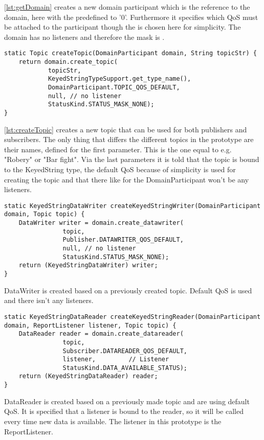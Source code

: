 \documentclass[Main]{subfiles}
\begin{document}
\codeTitle \ref{lst:getDomain} creates a new domain participant which is the reference to the domain, here with the  predefined to '0'.
Furthermore it specifies which QoS must be attached to the participant though the  is chosen here for simplicity.
The domain has no listeners and therefore the mask is .

\begin{lstlisting}[caption=RTIHelper: createTopic, style=Code-Java, label=lst:createTopic]
static Topic createTopic(DomainParticipant domain, String topicStr) {
	return domain.create_topic(
			topicStr, 
			KeyedStringTypeSupport.get_type_name(), 
			DomainParticipant.TOPIC_QOS_DEFAULT, 
			null, // no listener
			StatusKind.STATUS_MASK_NONE);
}
\end{lstlisting}


\codeTitle \ref{lst:createTopic} creates a new topic that can be used for both publishers and subscribers. The only thing that differs the different topics in the prototype are their names, defined for the first parameter. This is the one equal to e.g. "Robery" or "Bar fight". Via the last parameters it is told that the topic is bound to the KeyedString type, the default QoS because of simplicity is used for creating the topic and that there like for the DomainParticipant won't be any listeners. 

\begin{lstlisting}[caption=RTIHelper: createKeyedStringWriter, style=Code-Java, label=lst:createKeyedStringWriter]
static KeyedStringDataWriter createKeyedStringWriter(DomainParticipant domain, Topic topic) {
	DataWriter writer = domain.create_datawriter(
				topic, 
				Publisher.DATAWRITER_QOS_DEFAULT,
				null, // no listener
				StatusKind.STATUS_MASK_NONE);
	return (KeyedStringDataWriter) writer;
}
\end{lstlisting}

DataWriter is created based on a previously created topic. 
Default QoS  is used and there isn't any listeners.


\begin{lstlisting}[caption=RTIHelper: createKeyedStringReader, style=Code-Java, label=lst:createKeyedStringReader]
static KeyedStringDataReader createKeyedStringReader(DomainParticipant domain, ReportListener listener, Topic topic) {
	DataReader reader = domain.create_datareader(
				topic, 
				Subscriber.DATAREADER_QOS_DEFAULT,
				listener,         // Listener
				StatusKind.DATA_AVAILABLE_STATUS);
	return (KeyedStringDataReader) reader;
} 
\end{lstlisting}

DataReader is created based on a previously made topic and are using default QoS. 
It is specified that a listener is bound to the reader, so it will be called every time new data is available. 
The listener in this prototype is the ReportListener.
\end{document}
